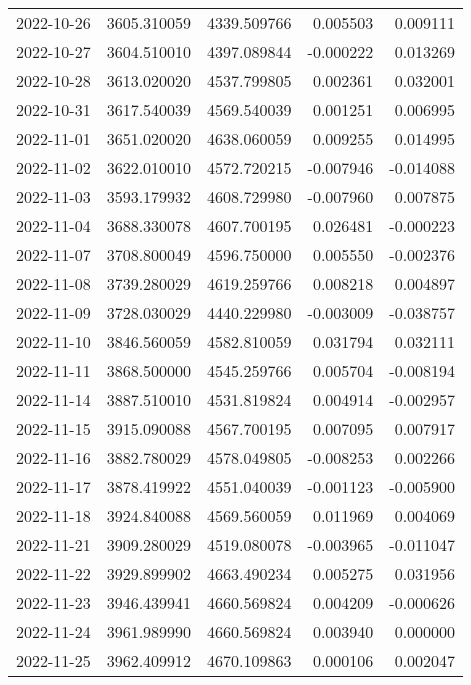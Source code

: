 \begin{tabular}{lrrrr}
2022-10-26 & 3605.310059 & 4339.509766 &        0.005503 &     0.009111 \\
2022-10-27 & 3604.510010 & 4397.089844 &       -0.000222 &     0.013269 \\
2022-10-28 & 3613.020020 & 4537.799805 &        0.002361 &     0.032001 \\
2022-10-31 & 3617.540039 & 4569.540039 &        0.001251 &     0.006995 \\
2022-11-01 & 3651.020020 & 4638.060059 &        0.009255 &     0.014995 \\
2022-11-02 & 3622.010010 & 4572.720215 &       -0.007946 &    -0.014088 \\
2022-11-03 & 3593.179932 & 4608.729980 &       -0.007960 &     0.007875 \\
2022-11-04 & 3688.330078 & 4607.700195 &        0.026481 &    -0.000223 \\
2022-11-07 & 3708.800049 & 4596.750000 &        0.005550 &    -0.002376 \\
2022-11-08 & 3739.280029 & 4619.259766 &        0.008218 &     0.004897 \\
2022-11-09 & 3728.030029 & 4440.229980 &       -0.003009 &    -0.038757 \\
2022-11-10 & 3846.560059 & 4582.810059 &        0.031794 &     0.032111 \\
2022-11-11 & 3868.500000 & 4545.259766 &        0.005704 &    -0.008194 \\
2022-11-14 & 3887.510010 & 4531.819824 &        0.004914 &    -0.002957 \\
2022-11-15 & 3915.090088 & 4567.700195 &        0.007095 &     0.007917 \\
2022-11-16 & 3882.780029 & 4578.049805 &       -0.008253 &     0.002266 \\
2022-11-17 & 3878.419922 & 4551.040039 &       -0.001123 &    -0.005900 \\
2022-11-18 & 3924.840088 & 4569.560059 &        0.011969 &     0.004069 \\
2022-11-21 & 3909.280029 & 4519.080078 &       -0.003965 &    -0.011047 \\
2022-11-22 & 3929.899902 & 4663.490234 &        0.005275 &     0.031956 \\
2022-11-23 & 3946.439941 & 4660.569824 &        0.004209 &    -0.000626 \\
2022-11-24 & 3961.989990 & 4660.569824 &        0.003940 &     0.000000 \\
2022-11-25 & 3962.409912 & 4670.109863 &        0.000106 &     0.002047 \\

\end{tabular}
